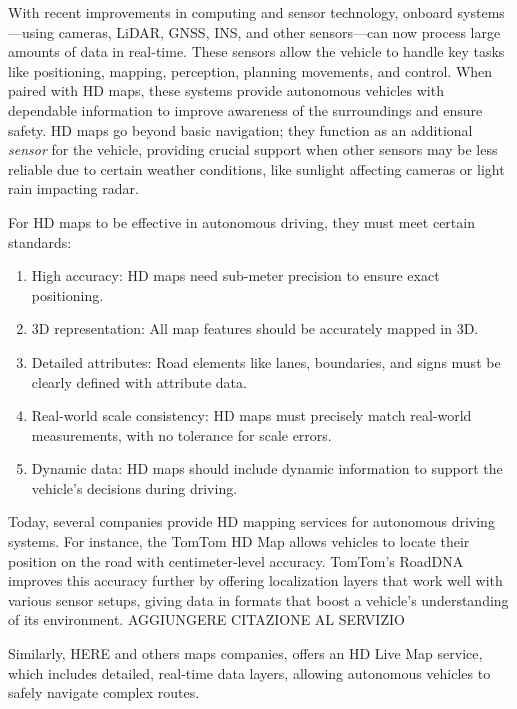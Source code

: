 With recent improvements in computing and sensor technology, onboard systems—using cameras, LiDAR, GNSS, INS, and other sensors—can now process large amounts of data in real-time. These sensors allow the vehicle to handle key tasks like positioning, mapping, perception, planning movements, and control. When paired with HD maps, these systems provide autonomous vehicles with dependable information to improve awareness of the surroundings and ensure safety.
HD maps go beyond basic navigation; they function as an additional \textit{sensor} for the vehicle, providing crucial support when other sensors may be less reliable due to certain weather conditions, like sunlight affecting cameras or light rain impacting radar\cite{edmap_2004}.

For HD maps to be effective in autonomous driving, they must meet certain standards:
\begin{enumerate}
    \item High accuracy: HD maps need sub-meter precision to ensure exact positioning.
    \item 3D representation: All map features should be accurately mapped in 3D.
    \item Detailed attributes: Road elements like lanes, boundaries, and signs must be clearly defined with attribute data.
    \item Real-world scale consistency: HD maps must precisely match real-world measurements, with no tolerance for scale errors.
    \item Dynamic data: HD maps should include dynamic information to support the vehicle’s decisions during driving.
\end{enumerate}

Today, several companies provide HD mapping services for autonomous driving systems. For instance, the TomTom HD Map allows vehicles to locate their position on the road with centimeter-level accuracy. TomTom’s RoadDNA improves this accuracy further by offering localization layers that work well with various sensor setups, giving data in formats that boost a vehicle’s understanding of its environment. AGGIUNGERE CITAZIONE AL SERVIZIO

Similarly, HERE and others maps companies, offers an HD Live Map service, which includes detailed, real-time data layers, allowing autonomous vehicles to safely navigate complex routes.

